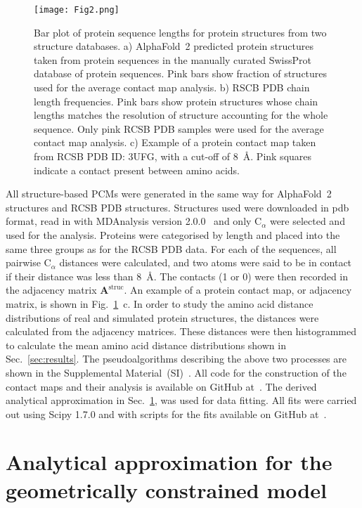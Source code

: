 \documentclass[
reprint,
twocolumn,
amsmath,amssymb,superscriptaddress,aps,
pre]{revtex4-1}
\begin{document}
 \begin{figure}[htb]
        \centering
	\texttt{[image: Fig2.png]}
	    \caption{Bar plot of protein sequence lengths for protein structures from two structure databases. a) AlphaFold~2 predicted protein structures taken from protein sequences in the manually curated SwissProt database of protein sequences. Pink bars show fraction of structures used for the average contact map analysis. b) RSCB PDB chain length frequencies. Pink bars show protein structures whose chain lengths matches the resolution of structure accounting for the whole sequence. Only pink RCSB PDB samples were used for the average contact map analysis. c) Example of a protein contact map taken from RCSB PDB ID: 3UFG, with a cut-off of 8~Å. Pink squares indicate a contact present between amino acids.}
        \label{fig:pdb_stats}
\end{figure}
All structure-based PCMs were generated in the same way for AlphaFold~2 structures and RCSB PDB structures. Structures used were downloaded in pdb format, read in with MDAnalysis version 2.0.0~\cite{gowers2016mdanalysis} and only C$_{\alpha}$ were selected and used for the analysis. Proteins were categorised by length and placed into the same three groups as for the RCSB PDB data. For each of the sequences, all pairwise C$_\alpha$ distances were calculated, and two atoms were said to be in contact if their distance was less than 8~Å. The contacts (1 or 0) were then recorded in the adjacency matrix $\mathbf{A}^{\mathrm{struc}}$. An example of a protein contact map, or adjacency matrix, is shown in Fig.~\ref{fig:pdb_stats}~c. In order to study the amino acid distance distributions of real and simulated protein structures, the distances were calculated from the adjacency matrices. These distances were then histogrammed to calculate the mean amino acid distance distributions shown in Sec.~\ref{sec:results}. The pseudoalgorithms describing the above two processes are shown in the Supplemental Material~(SI)~\cite{SI}. All code for the construction of the contact maps and their analysis is available on GitHub at~\cite{2022sequence}. The derived analytical approximation in Sec.~\ref{sec:theory}, was used for data fitting. All fits were carried out using Scipy 1.7.0 and with scripts for the fits available on GitHub at~\cite{2022sequence}.

\section{Analytical approximation for the geometrically constrained model}\label{sec:theory}
\end{document}
